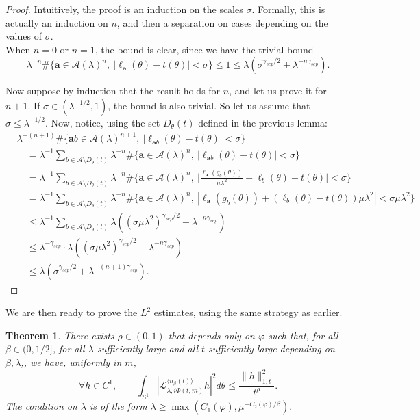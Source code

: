 \documentclass[11pt]{amsart}
\theoremstyle{plain}
\newtheorem{theorem}{Theorem}[section]
\theoremstyle{definition}
\numberwithin{equation}{section}
\begin{document}
\begin{proof}
Intuitively, the proof is an induction on the scales $\sigma$. Formally, this is actually an induction on $n$, and then a separation on cases depending on the values of $\sigma.$ \\
When $n=0$ or $n=1$, the bound is clear, since we have the trivial bound $$\lambda^{-n} \#\{ \mathbf{a} \in \mathcal{A}(\lambda)^n, \ |\ell_\mathbf{a}(\theta) - t(\theta)|<\sigma \} \leq 1 \leq \lambda\left(\sigma^{\gamma_{sep}/2}+\lambda^{-n\gamma_{sep}}\right).$$


Now suppose by induction that the result holds for $n$, and let us prove it for $n+1$. If $\sigma \in (\lambda^{-1/2},1)$, the bound is also trivial. So let us assume that $\sigma \leq \lambda^{-1/2}$. Now, notice, using the set $D_\theta(t)$ defined in the previous lemma:
\begin{align*}
&\lambda^{-(n+1)} \#\{ \mathbf{a}b \in \mathcal{A}(\lambda)^{n+1}, \ |\ell_{\mathbf{a}b}(\theta) - t(\theta)|<\sigma \} \\
&\quad = \lambda^{-1} \sum_{b \in \mathcal{A}\setminus D_\theta(t)} \lambda^{-n} \# \{ \mathbf{a} \in \mathcal{A}(\lambda)^{n}, \ |\ell_{\mathbf{a}b}(\theta) - t(\theta)|<\sigma \} \\
&\quad = \lambda^{-1} \sum_{b \in \mathcal{A}\setminus D_\theta(t)} \lambda^{-n} \# \Big\{ \mathbf{a} \in \mathcal{A}(\lambda)^{n}, \ \Big|\frac{\ell_{\mathbf{a}}(g_b(\theta))}{\mu \lambda^2} + \ell_b(\theta) - t(\theta)\Big|<\sigma \Big\} \\
&\quad = \lambda^{-1} \sum_{b \in \mathcal{A}\setminus D_\theta(t)} \lambda^{-n} \# \Big\{ \mathbf{a} \in \mathcal{A}(\lambda)^{n}, \ |\ell_{\mathbf{a}}(g_b(\theta)) + (\ell_b(\theta)-t(\theta))\mu\lambda^2|<\sigma\mu\lambda^2 \Big\} \\
&\quad \leq \lambda^{-1} \sum_{b \in \mathcal{A}\setminus D_\theta(t)} \lambda \left( (\sigma\mu\lambda^2)^{\gamma_{sep}/2} + \lambda^{-n\gamma_{sep}} \right) \\
&\quad \leq \lambda^{-\gamma_{sep}} \cdot \lambda \left( (\sigma\mu\lambda^2)^{\gamma_{sep}/2} + \lambda^{-n\gamma_{sep}} \right) \\
&\quad \leq \lambda \left( \sigma^{\gamma_{sep}/2} + \lambda^{-(n+1)\gamma_{sep}} \right).
\end{align*}
\end{proof}

We are then ready to prove the $L^2$ estimates, using the same strategy as earlier.

\begin{theorem}
There exists $\rho \in (0,1)$ that depends only on $\varphi$ such that, for all $\beta \in (0,1/2]$, for all $\lambda$ sufficiently large and all $t$ sufficiently large depending on $\beta,\lambda$,, we have, uniformly in $m$,
$$
\forall h \in C^1, \qquad
\int_{\mathbb{S}^1} |\mathcal{L}_{\lambda,i\Phi(t,m)}^{\langle n_\beta(t) \rangle} h|^2 d\theta
\leq \frac{\|h\|_{1,t}^2}{t^{\rho}}.
$$
The condition on $\lambda$ is of the form $\lambda \geq \max(C_1(\varphi),\mu^{-C_2(\varphi)/\beta}).$
\end{theorem}
\end{document}
